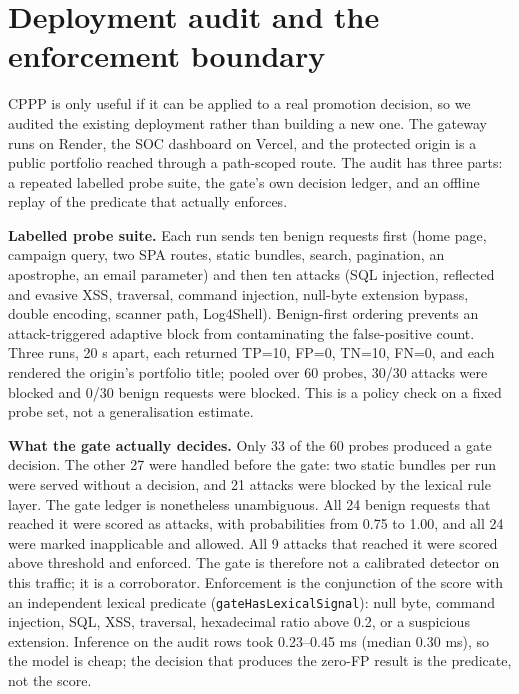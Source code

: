 \documentclass[preprint,11pt]{elsarticle}
\begin{document}
\section{Deployment audit and the enforcement
boundary}\label{deployment-audit-and-the-enforcement-boundary}

CPPP is only useful if it can be applied to a real promotion decision,
so we audited the existing deployment rather than building a new one.
The gateway runs on Render, the SOC dashboard on Vercel, and the
protected origin is a public portfolio reached through a path-scoped
route. The audit has three parts: a repeated labelled probe suite, the
gate's own decision ledger, and an offline replay of the predicate that
actually enforces.

\textbf{Labelled probe suite.} Each run sends ten benign requests first
(home page, campaign query, two SPA routes, static bundles, search,
pagination, an apostrophe, an email parameter) and then ten attacks (SQL
injection, reflected and evasive XSS, traversal, command injection,
null-byte extension bypass, double encoding, scanner path, Log4Shell).
Benign-first ordering prevents an attack-triggered adaptive block from
contaminating the false-positive count. Three runs, 20 s apart, each
returned TP=10, FP=0, TN=10, FN=0, and each rendered the origin's
portfolio title; pooled over 60 probes, 30/30 attacks were blocked and
0/30 benign requests were blocked. This is a policy check on a fixed
probe set, not a generalisation estimate.

\textbf{What the gate actually decides.} Only 33 of the 60 probes
produced a gate decision. The other 27 were handled before the gate: two
static bundles per run were served without a decision, and 21 attacks
were blocked by the lexical rule layer. The gate ledger is nonetheless
unambiguous. All 24 benign requests that reached it were scored as
attacks, with probabilities from 0.75 to 1.00, and all 24 were marked
inapplicable and allowed. All 9 attacks that reached it were scored
above threshold and enforced. The gate is therefore not a calibrated
detector on this traffic; it is a corroborator. Enforcement is the
conjunction of the score with an independent lexical predicate
(\texttt{gate\allowbreak{}Has\allowbreak{}Lexical\allowbreak{}Signal}): null byte, command injection, SQL, XSS,
traversal, hexadecimal ratio above 0.2, or a suspicious extension.
Inference on the audit rows took 0.23--0.45 ms (median 0.30 ms), so the
model is cheap; the decision that produces the zero-FP result is the
predicate, not the score.
\end{document}
